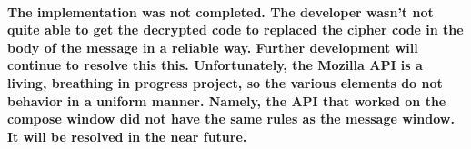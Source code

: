 \paragraph{The implementation was not completed. The developer wasn't not quite able to get the decrypted code to replaced the cipher code in the body of the message in a reliable way. Further development will continue to resolve this this. Unfortunately, the Mozilla API is a living, breathing in progress project, so the various elements do not behavior in a uniform manner. Namely, the API that worked on the compose window did not have the same rules as the message window. It will be resolved in the near future.}



